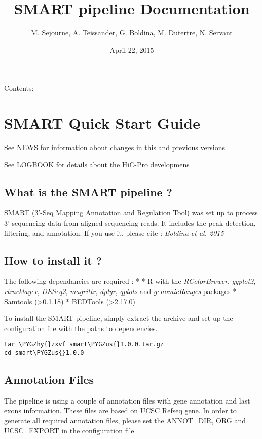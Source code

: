 \documentclass[letterpaper,10pt,english]{sphinxmanual}
\title{SMART pipeline Documentation}
\date{April 22, 2015}
\author{M. Sejourne, A. Teissander, G. Boldina, M. Dutertre, N. Servant}
\def\PYGZus{\char`\_}
\def\PYGZhy{\char`\-}
\begin{document}
\maketitle
\tableofcontents
{}\label{index::doc}


Contents:


\chapter{SMART Quick Start Guide}
\label{QUICKSTART:welcome-to-the-smart-documentation}\label{QUICKSTART::doc}\label{QUICKSTART:smart-quick-start-guide}
See NEWS for information about changes in this and previous versions

See LOGBOOK for details about the HiC-Pro developmens


\section{What is the SMART pipeline ?}
\label{QUICKSTART:what-is-the-smart-pipeline}
SMART (3'-Seq Mapping Annotation and Regulation Tool) was set up to process 3' sequencing data from aligned sequencing reads.
It includes the peak detection, filtering, and annotation.
If you use it, please cite :
\emph{Boldina et al. 2015}


\section{How to install it ?}
\label{QUICKSTART:how-to-install-it}
The following dependancies are required :
*
* R with the \emph{RColorBrewer}, \emph{ggplot2}, \emph{rtracklayer}, \emph{DESeq2}, \emph{magrittr}, \emph{dplyr}, \emph{qplots} and \emph{genomicRanges} packages
* Samtools (\textgreater{}0.1.18)
* BEDTools (\textgreater{}2.17.0)

To install the SMART pipeline, simply extract the archive and set up the configuration file with the paths to dependencies.

\begin{Verbatim}[commandchars=\\\{\}]
tar \PYGZhy{}zxvf smart\PYGZus{}1.0.0.tar.gz
cd smart\PYGZus{}1.0.0
\end{Verbatim}


\section{Annotation Files}
\label{QUICKSTART:annotation-files}
The pipeline is using a couple of annotation files with gene annotation and last exons information. These files are based on UCSC Refseq gene.
In order to generate all required annotation files, please set the ANNOT\_DIR, ORG and UCSC\_EXPORT in the configuration file
\end{document}
